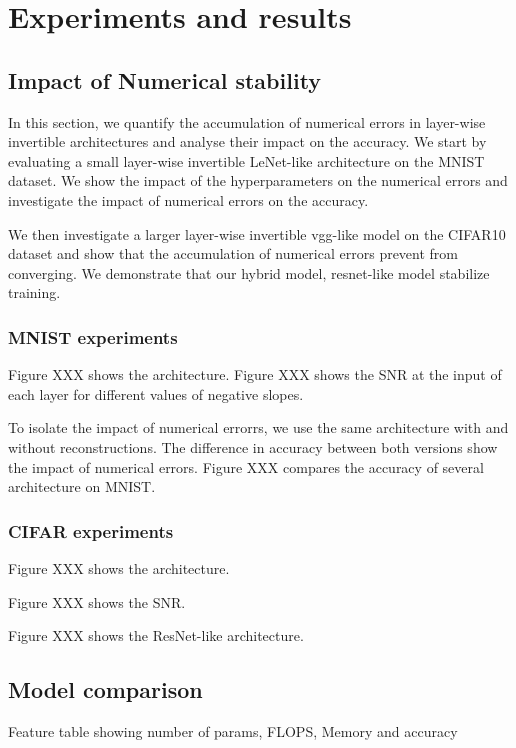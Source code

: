 \documentclass[twocolumn]{bmcart}
\begin{document}
\section{Experiments and results}

\subsection{Impact of Numerical stability}

In this section, we quantify the accumulation of numerical errors in layer-wise invertible architectures and analyse their impact on the accuracy.
We start by evaluating a small layer-wise invertible LeNet-like architecture on the MNIST dataset.
We show the impact of the hyperparameters on the numerical errors and investigate the impact of numerical errors on the accuracy.

We then investigate a larger layer-wise invertible vgg-like model on the CIFAR10 dataset and show that the accumulation of numerical errors prevent from converging.
We demonstrate that our hybrid model, resnet-like model stabilize training.

\subsubsection{MNIST experiments}

Figure XXX shows the architecture.
Figure XXX shows the SNR at the input of each layer for different values of negative slopes.

To isolate the impact of numerical errorrs, we use the same architecture with and without reconstructions.
The difference in accuracy between both versions show the impact of numerical errors.
Figure XXX compares the accuracy of several architecture on MNIST.

\subsubsection{CIFAR experiments}

Figure XXX shows the architecture.

Figure XXX shows the SNR.

Figure XXX shows the ResNet-like architecture.

\subsection{Model comparison}

Feature table showing number of params, FLOPS, Memory and accuracy
\end{document}
